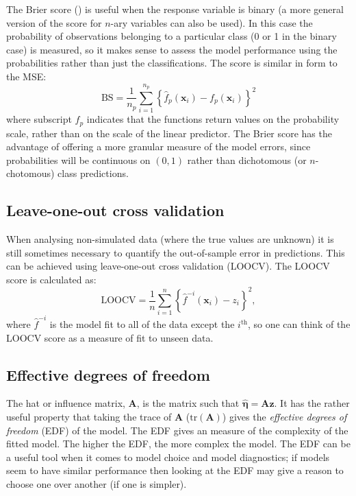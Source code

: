 The Brier score (\cite{brier50}) is useful when the response variable is binary (a more general version of the score for $n$-ary variables can also be used). In this case the probability of observations belonging to a particular class (0 or 1 in the binary case) is measured, so it makes sense to assess the model performance using the probabilities rather than just the classifications. The score is similar in form to the MSE:
\begin{equation}
\text{BS} = \frac{1}{n_p} \sum_{i=1}^{n_p} \left \{\hat{f}_p(\mathbf{x}_i)-f_p(\mathbf{x}_i) \right \}^2
\end{equation}
where subscript $f_p$ indicates that the functions return values on the probability scale, rather than on the  scale of the linear predictor. The Brier score has the advantage of offering a more granular measure of the model errors, since probabilities will be continuous on $(0,1)$ rather than dichotomous (or $n$-chotomous) class predictions.

\subsection{Leave-one-out cross validation}
\label{DEFN-LOOCV}

When analysing non-simulated data (where the true values are unknown) it is still sometimes necessary to quantify the out-of-sample error in predictions. This can be achieved using leave-one-out cross validation (LOOCV). The LOOCV score is calculated as:
\begin{equation}
\text{LOOCV} = \frac{1}{n} \sum_{i=1}^n \left \{ \hat{f}^{-i}(\mathbf{x}_i) - z_i \right\}^2,
\end{equation}
where $\hat{f}^{-i}$ is the model fit to all of the data except the $i^\text{th}$, so one can think of the LOOCV score as a measure of fit to unseen data.

\subsection{Effective degrees of freedom}
\label{GAMEDF}

The hat or influence matrix, $\mathbf{A}$, is the matrix such that $\hat{\bm{\eta}} = \mathbf{A}\mathbf{z}$. It has the rather useful property that taking the trace of $\mathbf{A}$ ($\text{tr}(\mathbf{A})$) gives the \textit{effective degrees of freedom} (EDF) of the model. The EDF gives an measure of the complexity of the fitted model. The higher the EDF, the more complex the model. The EDF can be a useful tool when it comes to model choice and model diagnostics; if models seem to have similar performance then looking at the EDF may give a reason to choose one over another (if one is simpler).

